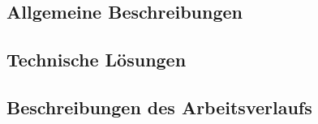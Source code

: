 \chapter{\docname}
\label{\docname}

\section{Allgemeine Beschreibungen}

\section{Technische Lösungen}

\section{Beschreibungen des Arbeitsverlaufs}